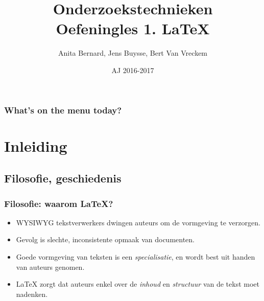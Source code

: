 \documentclass{beamer}
\title[Intro]{Onderzoekstechnieken\\Oefeningles 1. \LaTeX{}}
\author{Anita Bernard, Jens Buysse, Bert {Van Vreckem}}
\date{AJ 2016-2017}
\begin{document}

\HoGentLogo

\titleframe


\begin{frame}
  \frametitle{What's on the menu today?}

  \tableofcontents
\end{frame}

\section{Inleiding}

\subsection{Filosofie, geschiedenis}

\begin{frame}
  \frametitle{Filosofie: waarom {\LaTeX}?}
  
  \begin{itemize}
  \item<+-> WYSIWYG tekstverwerkers dwingen auteurs om de vormgeving te verzorgen.
  \item<+-> Gevolg is slechte, inconsistente opmaak van documenten.
  \item<+-> Goede vormgeving van teksten is een \emph{specialisatie}, en wordt best
    uit handen van auteurs genomen.
  \item<+-> {\LaTeX} zorgt dat auteurs enkel over de \emph{inhoud} en \emph{structuur} van de tekst moet nadenken.
  \end{itemize}
\end{frame}
\end{document}

